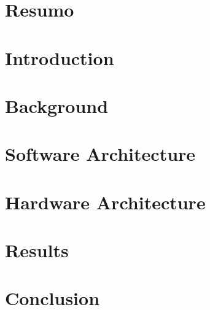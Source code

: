 \documentclass[10pt]{esda}
\begin{document}
\cleardoublepage
\section*{Resumo}


\cleardoublepage
\tableofcontents
\listoftables
\listoffigures

\cleardoublepage


\cleardoublepage
\section{Introduction}
\label{sec:intro}


\cleardoublepage
\section{Background}
\label{sec:back}


\cleardoublepage
\section{Software Architecture}
\label{sec:sw}


\cleardoublepage
\section{Hardware Architecture}
\label{sec:hw}


\cleardoublepage
\section{Results}
\label{sec:results}


\cleardoublepage
\section{Conclusion}
\label{sec:conc}


\cleardoublepage
{}


\end{document}
